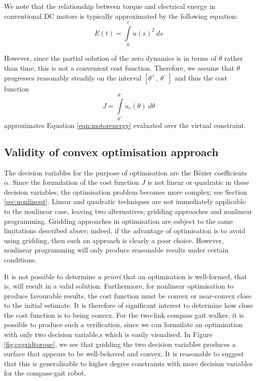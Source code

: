 We note that the relationship between torque and electrical energy in conventional DC motors is typically approximated by the following equation: \cite{??}
\begin{equation} \label{eqn:motorenergy}
	E(t) = \int\limits_0^t u(s)^2 ~ ds
\end{equation}

However, since the partial solution of the zero dynamics is in terms of $\theta$ rather than time, this is not a convenient cost function. Therefore, we assume that $\theta$ progresses reasonably steadily on the interval $[\theta^+,~\theta^-]$ and thus the cost function
\begin{equation}
	J = \int\limits_{\theta^+}^{\theta^-} u_c(\theta) ~ d\theta
\end{equation}
approximates Equation \ref{eqn:motorenergy} evaluated over the virtual constraint.

\subsection{Validity of convex optimisation approach}
The decision variables for the purpose of optimisation are the Bézier coefficients $\alpha$. Since the formulation of the cost function $J$ is not linear or quadratic in these decision variables, the optimisation problem becomes more complex; see Section \ref{sec:nonlinopt}. Linear and quadratic techniques are not immediately applicable to the nonlinear case, leaving two alternatives; gridding approaches and nonlinear programming. Gridding approaches in optimisation are subject to the same limitations described above; indeed, if the advantage of optimisation is to avoid using gridding, then such an approach is clearly a poor choice. However, nonlinear programming will only produce reasonable results under certain conditions.

It is not possible to determine \textit{a priori} that an optimisation is well-formed, that is, will result in a valid solution. Furthermore, for nonlinear optimisation to produce favourable results, the cost function must be convex or near-convex close to the initial estimate. It is therefore of significant interest to determine how close the cost function is to being convex. For the two-link compass gait walker, it is possible to produce such a verification, since we can formulate an optimisation with only two decision variable,s which is easily visualised. In Figure \ref{fig:cggridtorque}, we see that gridding the two decision variables produces a surface that appears to be well-behaved and convex. It is reasonable to suggest that this is generalisable to higher degree constraints with more decision variables for the compass-gait robot.

